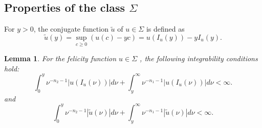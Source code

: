 \documentclass[a4paper,report, 11pt]{article}
\newtheorem{lem}{Lemma}[section]
\begin{document}
\subsection{Properties of the class $\Sigma$}

For $y>0$, the {conjugate function} $\tilde{u}$ of $u\in \Sigma$ is defined as 
\begin{equation*}
\tilde{u}(y) = \sup_{c\ge 0}\left(u(c)-yc\right) = u(I_u(y))- yI_u(y).
\end{equation*}

\begin{lem}\label{lem:finite}
	For the felicity function $u\in \Sigma$ , the following integrability conditions hold:
	\begin{equation*}
	\int_0^y \nu^{-n_2-1} |u(I_u(\nu))|d\nu +\int_y^\infty \nu^{-n_1-1}|u(I_u(\nu))|d\nu <\infty. 
	\end{equation*}
	and
	\begin{equation*}
	\int_0^y \nu^{-n_2-1} |\tilde{u}(\nu)|d\nu +\int_y^\infty \nu^{-n_1-1}|\tilde{u}(\nu)|d\nu <\infty. 
	\end{equation*}
\end{lem}
\end{document}

